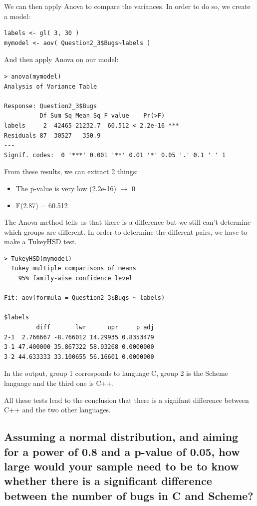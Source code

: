 \documentclass[12pt,a4paper]{scrartcl}
\begin{document}
We can then apply Anova to compare the variances. In order to do so, we create a model:
\begin{lstlisting}[frame=single]
labels <- gl( 3, 30 )
mymodel <- aov( Question2_3$Bugs~labels )

\end{lstlisting}
And then apply Anova on our model:
\begin{lstlisting}[frame=single]
> anova(mymodel)
Analysis of Variance Table

Response: Question2_3$Bugs
          Df Sum Sq Mean Sq F value    Pr(>F)    
labels     2  42465 21232.7  60.512 < 2.2e-16 ***
Residuals 87  30527   350.9                      
---
Signif. codes:  0 '***' 0.001 '**' 0.01 '*' 0.05 '.' 0.1 ' ' 1
\end{lstlisting}
From these results, we can extract 2 things:
\begin{itemize}
\item{The p-value is very low (2.2e-16) $\rightarrow$  0}
\item{F(2.87) = 60.512}
\end{itemize}

\pagebreak
The Anova method tells us that there is a difference but we still can't determine which groups are different. In order to determine the different pairs, we have to make a TukeyHSD test.

\begin{lstlisting}[frame=single]
> TukeyHSD(mymodel)
  Tukey multiple comparisons of means
    95% family-wise confidence level

Fit: aov(formula = Question2_3$Bugs ~ labels)

$labels
         diff       lwr      upr     p adj
2-1  2.766667 -8.766012 14.29935 0.8353479
3-1 47.400000 35.867322 58.93268 0.0000000
3-2 44.633333 33.100655 56.16601 0.0000000
\end{lstlisting}
In the output, group 1 corresponds to language C, group 2 is the Scheme language and the third one is C++.

All these tests lead to the conclusion that there is a signifant difference between C++ and the two other languages.

\subsection{Assuming a normal distribution, and aiming for a power of 0.8 and a p-value of 0.05, how large would your sample need to be to know whether there is a significant difference between the number of bugs in C and Scheme?}
\end{document}
